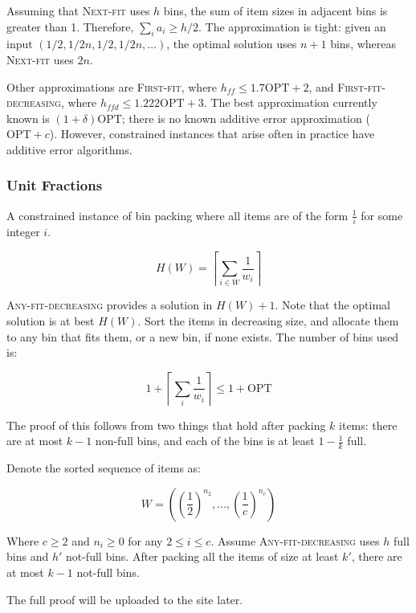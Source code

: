 \documentclass{idc_msc}
\begin{document}
Assuming that \textsc{Next-fit} uses \(h\) bins, the sum of item sizes in adjacent bins is greater than 1.
Therefore, \(\sum_i a_i \ge h / 2\).
The approximation is tight: given an input \((1/2, 1/2n, 1/2, 1/2n, \ldots)\), the optimal solution uses \(n+1\) bins, whereas \textsc{Next-fit} uses \(2n\).

Other approximations are \textsc{First-fit}, where \(h_{ff} \le 1.7 \text{OPT} + 2\), and \textsc{First-fit-decreasing}, where \(h_{ffd} \le 1.222 \text{OPT} + 3\).
The best approximation currently known is \((1+\delta) \text{OPT}\); there is no known additive error approximation (\(\text{OPT} + c\)).
However, constrained instances that arise often in practice have additive error algorithms.

\subsubsection{Unit Fractions}

A constrained instance of bin packing where all items are of the form \(\frac{1}{i}\) for some integer \(i\).

\[
  H(W) = \left\lceil\sum_{i \in W} \frac{1}{w_i}\right\rceil
\]

\textsc{Any-fit-decreasing} provides a solution in \(H(W) + 1\).
Note that the optimal solution is at best \(H(W)\).
Sort the items in decreasing size, and allocate them to any bin that fits them, or a new bin, if none exists.
The number of bins used is:

\[
  1 + \left\lceil\sum_i \frac{1}{w_i} \right\rceil \le 1 + \text{OPT}
\]

The proof of this follows from two things that hold after packing \(k\) items: there are at most \(k-1\) non-full bins, and each of the bins is at least \(1-\frac{1}{k}\) full.

Denote the sorted sequence of items as:

\[
W = \left(\left(\frac{1}{2}\right)^{n_2}, \ldots, \left(\frac{1}{c}\right)^{n_c} \right)
\]

Where \(c \ge 2\) and \(n_i \ge 0\) for any \(2 \le i \le c\).
Assume \textsc{Any-fit-decreasing} uses \(h\) full bins and \(h'\) not-full bins.
After packing all the items of size at least \(k'\), there are at most \(k - 1\) not-full bins.


The full proof will be uploaded to the site later.
\end{document}

